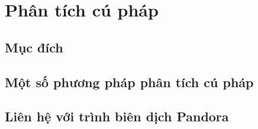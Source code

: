 \section{Phân tích cú pháp}
\subsection{Mục đích}
\subsection{Một số phương pháp phân tích cú pháp}
\subsection{Liên hệ với trình biên dịch Pandora}